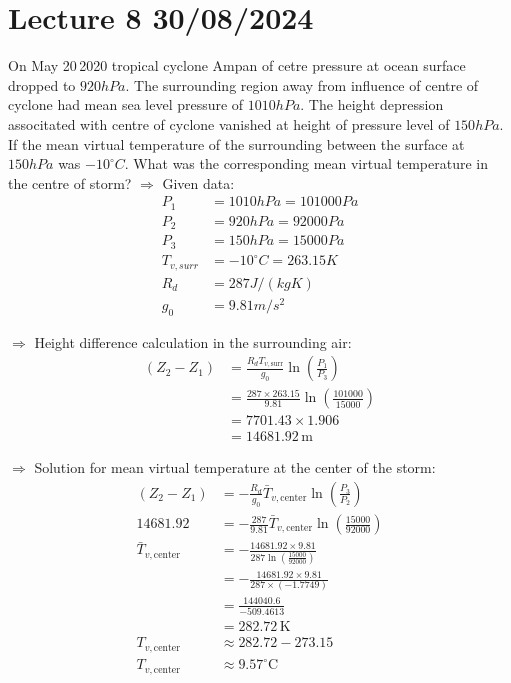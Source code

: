 \documentclass[fleqn,10pt]{SelfArx} %
\begin{document}
\section{Lecture 8 30/08/2024}
\begin{question}[label=q:8.1]{On May 20\,2020  tropical cyclone Ampan of cetre pressure at ocean surface dropped to $920hPa$. The surrounding region away from influence of centre of cyclone had mean sea level pressure of $1010hPa$. The height depression associtated with centre of cyclone vanished at height of pressure level of $150hPa$. If the mean virtual temperature of the surrounding between the surface at $150hPa$ was $-10^{\circ}C$. What was the corresponding mean virtual temperature in the centre of storm?}
    $\Rightarrow$ Given data:
    \begin{align*}
         P_1 &= 1010 hPa = 101000 Pa \\
         P_2 &= 920 hPa = 92000 Pa \\
         P_3 &= 150 hPa = 15000 Pa \\
         T_{v,surr} &= -10^\circ C = 263.15 K \\
         R_d &= 287 J/(kg K) \\
         g_0 &= 9.81 m/s^2
    \end{align*}

    $\Rightarrow$ Height difference calculation in the surrounding air:
    \begin{align*}
        (Z_2 - Z_1) &= \frac{R_d T_{v,\text{surr}}}{g_0} \ln\left(\frac{P_1}{P_3}\right) \\
        &= \frac{287 \times 263.15}{9.81} \ln\left(\frac{101000}{15000}\right) \\
        &= 7701.43 \times 1.906 \\
        &= 14681.92 \, \text{m}
    \end{align*}

    $\Rightarrow$ Solution for mean virtual temperature at the center of the storm:
    \begin{align*}
        (Z_2 - Z_1) &= -\frac{R_d}{g_0} \bar{T}_{v,\text{center}} \ln\left(\frac{P_3}{P_2}\right) \\
        14681.92 &= -\frac{287}{9.81} \bar{T}_{v,\text{center}} \ln\left(\frac{15000}{92000}\right) \\
        \bar{T}_{v,\text{center}} &= -\frac{14681.92 \times 9.81}{287 \ln\left(\frac{15000}{92000}\right)} \\
        &= -\frac{14681.92 \times 9.81}{287 \times (-1.7749)} \\
        &= \frac{144040.6}{-509.4613} \\
        &= 282.72 \, \text{K} \\
        T_{v,\text{center}} &\approx 282.72 - 273.15 \\
        T_{v,\text{center}} &\approx 9.57^\circ \text{C}
    \end{align*}
\end{question}
\end{document}
